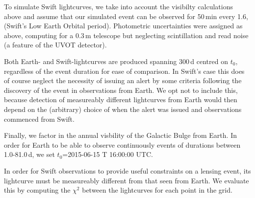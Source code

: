 \documentclass[preprint2]{aastex}
\begin{document}
To simulate Swift lightcurves, we take into account the visibilty calculations above and assume that our simulated event can be observed for 50\,min every 1.6,\hrs (Swift's Low Earth Orbital period).  Photometric uncertainties were assigned as above, computing for a 0.3\,m telescope but neglecting scintillation and read noise (a feature of the UVOT detector).  

Both Earth- and Swift-lightcurves are produced spanning 300\,d centred on $t_{0}$, regardless of the event duration for ease of comparison.  In Swift's case this does of course neglect the necessity of issuing an alert by some criteria following the discovery of the event in observations from Earth.  We opt not to include this, because detection of measureably different lightcurves from Earth would then depend on the (arbitrary) choice of when the alert was issued and observations commenced from Swift.  

Finally, we factor in the annual visbility of the Galactic Bulge from Earth.  In order for Earth to be able to observe continuously events of durations between 1.0-81.0\,d, we set $t_{0}$=2015-06-15 T 16:00:00 UTC.  

In order for Swift observations to provide useful constraints on a lensing event, its lightcurve must be measureably different from that seen from Earth.  We evaluate this by computing the $\chi^{2}$ between the lightcurves for each point in the grid.  
\end{document}
